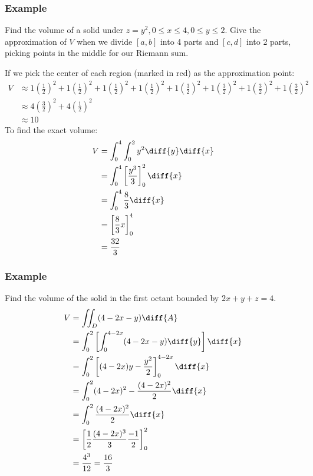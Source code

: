 \documentclass[letterpaper, 12pt]{math}
\begin{document}
\subsubsection*{Example}
Find the volume of a solid under \( z = y^2, 0\le x\le4, 0\le y\le2 \). Give
the approximation of \( V \) when we divide \( [a,b] \) into 4 parts and
\( [c,d] \) into 2 parts, picking points in the middle for our Riemann sum.
\begin{center}
\end{center}
If we pick the center of each region (marked in red) as the approximation point:
\begin{align*}
  V &\approx
    1(\frac{1}{2})^2+1(\frac{1}{2})^2+1(\frac{1}{2})^2+1(\frac{1}{2})^2+
    1(\frac{3}{2})^2+1(\frac{3}{2})^2+1(\frac{3}{2})^2+1(\frac{3}{2})^2 \\
  &\approx 4(\frac{3}{2})^2+4(\frac{1}{2})^2 \\
  &\approx 10
\end{align*}
To find the exact volume:
\begin{align*}
  V &= \int_{0}^{4}\int_{0}^{2}y^2\diff{y}\diff{x} \\
  &= \int_{0}^{4}\left[\frac{y^3}{3}\right]_0^2\diff{x} \\
  &= \int_{0}^{4}\frac{8}{3}\diff{x} \\
  &= \left[\frac{8}{3}x\right]_0^4 \\
  &= \frac{32}{3}
\end{align*}

\subsubsection*{Example}
Find the volume of the solid in the first octant bounded by \( 2x+y+z = 4 \).
\begin{align*}
  V &= \iint_{D}(4-2x-y)\diff{A} \\
  &= \int_{0}^{2}\left[\int_{0}^{4-2x}(4-2x-y)\diff{y}\right]\diff{x} \\
  &= \int_{0}^{2}\left[(4-2x)y-\frac{y^2}{2}\right]_0^{4-2x}\diff{x} \\
  &= \int_{0}^{2}(4-2x)^2-\frac{(4-2x)^2}{2}\diff{x} \\
  &= \int_{0}^{2}\frac{(4-2x)^2}{2}\diff{x} \\
  &= \left[\frac{1}{2}\frac{(4-2x)^3}{3}\frac{-1}{2}\right]_{0}^{2} \\
  &= \frac{4^3}{12} = \frac{16}{3}
\end{align*}
\end{document}
